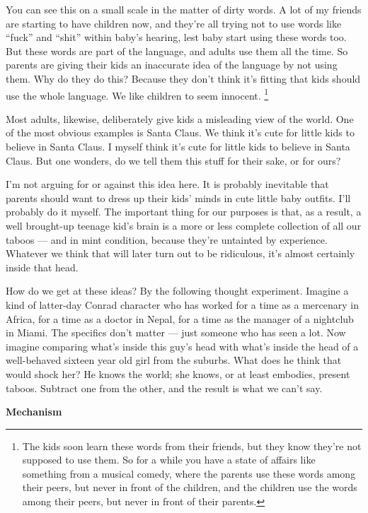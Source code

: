 You can see this on a small scale in the matter of dirty words. A lot of
my friends are starting to have children now, and they're all trying not
to use words like ``fuck'' and ``shit'' within baby's hearing, lest baby
start using these words too. But these words are part of the language,
and adults use them all the time. So parents are giving their kids an
inaccurate idea of the language by not using them. Why do they do this?
Because they don't think it's fitting that kids should use the whole
language. We like children to seem innocent. \footnote{The kids soon learn these words from their friends, but they
know they're not supposed to use them. So for a while you have a state
of affairs like something from a musical comedy, where the parents use
these words among their peers, but never in front of the children, and
the children use the words among their peers, but never in front of
their parents.}

Most adults, likewise, deliberately give kids a misleading view of the
world. One of the most obvious examples is Santa Claus. We think it's
cute for little kids to believe in Santa Claus. I myself think it's cute
for little kids to believe in Santa Claus. But one wonders, do we tell
them this stuff for their sake, or for ours?

I'm not arguing for or against this idea here. It is probably inevitable
that parents should want to dress up their kids' minds in cute little
baby outfits. I'll probably do it myself. The important thing for our
purposes is that, as a result, a well brought-up teenage kid's brain is
a more or less complete collection of all our taboos --- and in mint
condition, because they're untainted by experience. Whatever we think
that will later turn out to be ridiculous, it's almost certainly inside
that head.

How do we get at these ideas? By the following thought experiment.
Imagine a kind of latter-day Conrad character who has worked for a time
as a mercenary in Africa, for a time as a doctor in Nepal, for a time as
the manager of a nightclub in Miami. The specifics don't matter --- just
someone who has seen a lot. Now imagine comparing what's inside this
guy's head with what's inside the head of a well-behaved sixteen year
old girl from the suburbs. What does he think that would shock her? He
knows the world; she knows, or at least embodies, present taboos.
Subtract one from the other, and the result is what we can't say.

\textbf{Mechanism}

